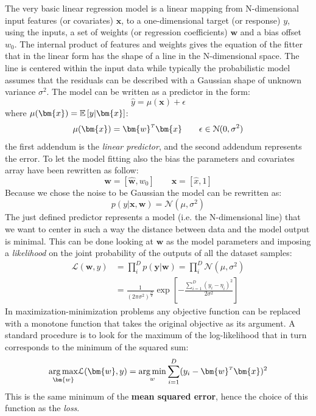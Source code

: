 The very basic linear regression model is a linear mapping from N-dimensional input features (or covariates) $\bm{x}$, to a one-dimensional target (or response) $y$, using the inputs, a set of weights (or regression coefficients) $\bm{w}$ and a bias offset $w_0$. The internal product of features and weights gives the equation of the fitter that in the linear form has the shape of a line in the N-dimensional space. The line is centered within the input data while typically the probabilistic model assumes that the residuals can be described with a Gaussian shape of unknown variance $\sigma^2$. The model can be written as a predictor in the form:
\begin{equation}
    \hat{y} = \mu(\bm{x}) + \epsilon
\end{equation}
where $\mu(\bm{x}) = \expectation{y|\bm{x}}$:
\begin{equation}
     \mu(\bm{x}) = \transpose{\bm{w}}\bm{x} \qquad  \epsilon \in \mathcal{N}(0,\sigma^2)
\end{equation}
the first addendum is the \textit{linear predictor}, and the second addendum represents the error. To let the model fitting also the bias the parameters and covariates array have been rewritten as follow:
\begin{equation}
    \bm{w} = [\hat{\bm{w}},w_0] \qquad \bm{x} = [\hat{x}, 1]
\end{equation}
Because we chose the noise to be Gaussian the model can be rewritten as:
\begin{equation}
    p(y|\bm{x},\bm{w}) = \mathcal{N}(\mu, \sigma^2)
\end{equation}
The just defined predictor represents a model (i.e. the N-dimensional line) that we want to center in such a way the distance between data and the model output is minimal.
This can be done looking at $\bm{w}$ as the model parameters and imposing a \textit{likelihood} on the joint probability of the outputs of all the dataset samples:
\begin{align}
    \mathcal{L}(\bm{w}, y) &= \prod_i^D p(\bm{y}|\bm{w}) = \prod_i^D \mathcal{N}(\mu,\sigma^2) \\
    &= \frac{1}{(2\pi \sigma^2)^{\frac{D}{2}}} \exp \left[  -\frac{\sum_{i=1}^D (y_i-\eta_i)^2}{2\sigma^2} \right]
\end{align}
In maximization-minimization problems any objective function can be replaced with a monotone function that takes the original objective as its argument. A standard procedure is to look for the maximum of the log-likelihood that in turn corresponds to the minimum of the squared sum:
\begin{equation}
    \argmax{\bm{w}} \mathcal{L}(\bm{w},y) = \argmin{w} \sum_{i=1}^D (y_i - \transpose{\bm{w}}\bm{x})^2
\end{equation}
This is the same minimum of the \textbf{mean squared error}, hence the choice of this function as the \textit{loss}.

